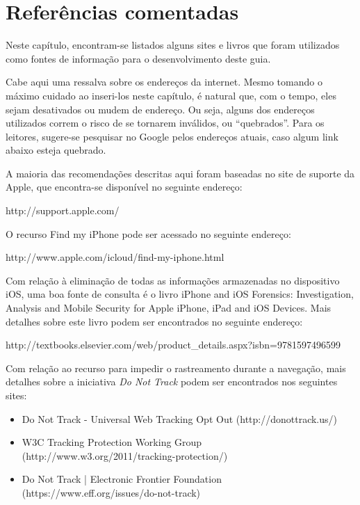 \chapter{Refer\^encias comentadas}

Neste cap\'itulo, encontram-se listados alguns sites e livros que foram utilizados como fontes de informa\c c\~ao para o desenvolvimento deste guia. 

Cabe aqui uma ressalva sobre os endere\c cos da internet. Mesmo tomando o m\'aximo cuidado ao inseri-los neste cap\'itulo, \'e natural que, com o tempo, eles sejam desativados ou mudem de endere\c co. Ou seja, alguns dos endere\c cos utilizados correm o risco de se tornarem inv\'alidos, ou ``quebrados''. Para os leitores, sugere-se pesquisar no Google pelos endere\c cos atuais, caso algum link abaixo esteja quebrado. 

A maioria das recomenda\c c\~oes descritas aqui foram baseadas no site de suporte da Apple, que encontra-se dispon\'ivel no seguinte endere\c co:

\vspace{5mm}
http://support.apple.com/
\vspace{5mm}

O recurso Find my iPhone pode ser acessado no seguinte endere\c co:

\vspace{5mm}
http://www.apple.com/icloud/find-my-iphone.html
\vspace{5mm}

Com rela\c c\~ao \`a elimina\c c\~ao de todas as informa\c c\~oes armazenadas no dispositivo iOS, uma boa fonte de consulta \'e o livro iPhone and iOS Forensics: Investigation, Analysis and Mobile Security for Apple iPhone, iPad and iOS Devices. Mais detalhes sobre este livro podem ser encontrados no seguinte endere\c co:

\vspace{5mm}
http://textbooks.elsevier.com/web/product\_details.aspx?isbn=9781597496599
\vspace{5mm}

Com rela\c c\~ao ao recurso para impedir o rastreamento durante a navega\c c\~ao, mais detalhes sobre a iniciativa \textit{Do Not Track} podem ser encontrados nos seguintes sites: 

\begin{itemize}
\item Do Not Track - Universal Web Tracking Opt Out (http://donottrack.us/)
\item W3C Tracking Protection Working Group (http://www.w3.org/2011/tracking-protection/)
\item Do Not Track | Electronic Frontier Foundation (https://www.eff.org/issues/do-not-track)
\end{itemize}
